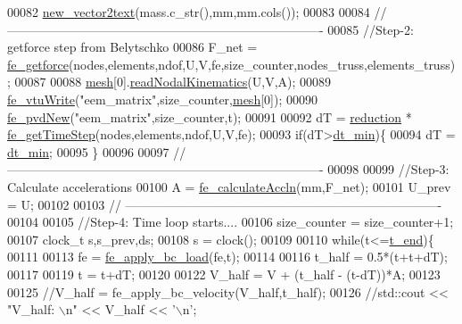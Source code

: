 \begin{DoxyCode}
00082     \hyperlink{functions_8h_a62d4a4906ace3f822fcebf7605c33c2b}{new\_vector2text}(mass.c\_str(),mm,mm.cols());
00083 
00084     \textcolor{comment}{// ----------------------------------------------------------------------------}
00085  \textcolor{comment}{//Step-2: getforce step from Belytschko}
00086     F\_net = \hyperlink{functions_8h_a6696827a8591495e5ea710b112fad5ef}{fe\_getforce}(nodes,elements,ndof,U,V,fe,size\_counter,nodes\_truss,elements\_truss);
00087 
00088     \hyperlink{_global_variables_8h_a6e08f89b32254fb4b129720418e7c6ea}{mesh}[0].\hyperlink{class_mesh_a2193a797388525febbac794d17bea23e}{readNodalKinematics}(U,V,A);
00089     \hyperlink{functions_8h_a9c39148b76d7691ea87e7f2f88b02295}{fe\_vtuWrite}(\textcolor{stringliteral}{"eem\_matrix"},size\_counter,\hyperlink{_global_variables_8h_a6e08f89b32254fb4b129720418e7c6ea}{mesh}[0]);
00090     \hyperlink{functions_8h_aedbf95dc6f02a506b606328037cd58e1}{fe\_pvdNew}(\textcolor{stringliteral}{"eem\_matrix"},size\_counter,t);
00091 
00092     dT = \hyperlink{_global_variables_8h_a7700f3aeb1ca1c9bbbf712dbfb0aa349}{reduction} * \hyperlink{functions_8h_a537640b537f4b485607b062f2c25d974}{fe\_getTimeStep}(nodes,elements,ndof,U,V,fe);
00093     \textcolor{keywordflow}{if}(dT>\hyperlink{_global_variables_8h_a0a612324885914b6799185d54c48b310}{dt\_min})\{
00094         dT = \hyperlink{_global_variables_8h_a0a612324885914b6799185d54c48b310}{dt\_min};
00095     \}
00096 
00097     \textcolor{comment}{// ----------------------------------------------------------------------------}
00098 
00099     \textcolor{comment}{//Step-3: Calculate accelerations}
00100     A  = \hyperlink{functions_8h_a049ed85fefb5b5e80e42432fdcc640fa}{fe\_calculateAccln}(mm,F\_net);
00101     U\_prev = U;
00102 
00103     \textcolor{comment}{// ----------------------------------------------------------------------------}
00104 
00105     \textcolor{comment}{//Step-4: Time loop starts....}
00106     size\_counter = size\_counter+1;
00107     clock\_t s,s\_prev,ds;
00108     s = clock();
00109 
00110        \textcolor{keywordflow}{while}(t<=\hyperlink{_global_variables_8h_a4b637c5fff609e604a3b2b2787f4a9fa}{t\_end})\{
00111 
00113                 fe = \hyperlink{functions_8h_aba32cc24bd74a4965c560fa62c5b213e}{fe\_apply\_bc\_load}(fe,t);
00114 
00116                 t\_half = 0.5*(t+t+dT);
00117 
00119                 t = t+dT;
00120 
00122                 V\_half = V + (t\_half - (t-dT))*A;
00123 
00125                 \textcolor{comment}{//V\_half = fe\_apply\_bc\_velocity(V\_half,t\_half);}
00126                 \textcolor{comment}{//std::cout << "V\_half: \(\backslash\)n" << V\_half << '\(\backslash\)n';}

\end{DoxyCode}
